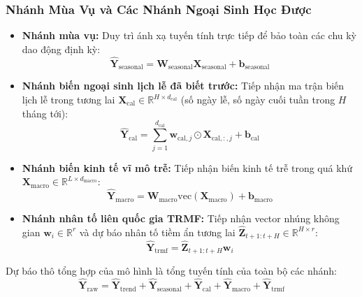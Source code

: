 \subsubsection{Nhánh Mùa Vụ và Các Nhánh Ngoại Sinh Học Được}
\begin{itemize}
    \item \textbf{Nhánh mùa vụ:} Duy trì ánh xạ tuyến tính trực tiếp để bảo toàn các chu kỳ dao động định kỳ:
    \begin{equation}
        \hat{\mathbf{Y}}_{\text{seasonal}} = \mathbf{W}_{\text{seasonal}} \mathbf{X}_{\text{seasonal}} + \mathbf{b}_{\text{seasonal}}
    \end{equation}
    \item \textbf{Nhánh biến ngoại sinh lịch lễ đã biết trước:} Tiếp nhận ma trận biến lịch lễ trong tương lai $\mathbf{X}_{\text{cal}} \in \mathbb{R}^{H \times d_{\text{cal}}}$ (số ngày lễ, số ngày cuối tuần trong $H$ tháng tới):
    \begin{equation}
        \hat{\mathbf{Y}}_{\text{cal}} = \sum_{j=1}^{d_{\text{cal}}} \mathbf{w}_{\text{cal}, j} \odot \mathbf{X}_{\text{cal}, :, j} + \mathbf{b}_{\text{cal}}
    \end{equation}
    \item \textbf{Nhánh biến kinh tế vĩ mô trễ:} Tiếp nhận biến kinh tế trễ trong quá khứ $\mathbf{X}_{\text{macro}} \in \mathbb{R}^{L \times d_{\text{macro}}}$:
    \begin{equation}
        \hat{\mathbf{Y}}_{\text{macro}} = \mathbf{W}_{\text{macro}} \text{vec}(\mathbf{X}_{\text{macro}}) + \mathbf{b}_{\text{macro}}
    \end{equation}
    \item \textbf{Nhánh nhân tố liên quốc gia TRMF:} Tiếp nhận vector nhúng không gian $\mathbf{w}_i \in \mathbb{R}^r$ và dự báo nhân tố tiềm ẩn tương lai $\hat{\mathbf{Z}}_{t+1:t+H} \in \mathbb{R}^{H \times r}$:
    \begin{equation}
        \hat{\mathbf{Y}}_{\text{trmf}} = \hat{\mathbf{Z}}_{t+1:t+H} \mathbf{w}_i
    \end{equation}
\end{itemize}

Dự báo thô tổng hợp của mô hình là tổng tuyến tính của toàn bộ các nhánh:
\begin{equation}
    \hat{\mathbf{Y}}_{\text{raw}} = \hat{\mathbf{Y}}_{\text{trend}} + \hat{\mathbf{Y}}_{\text{seasonal}} + \hat{\mathbf{Y}}_{\text{cal}} + \hat{\mathbf{Y}}_{\text{macro}} + \hat{\mathbf{Y}}_{\text{trmf}}
\end{equation}

